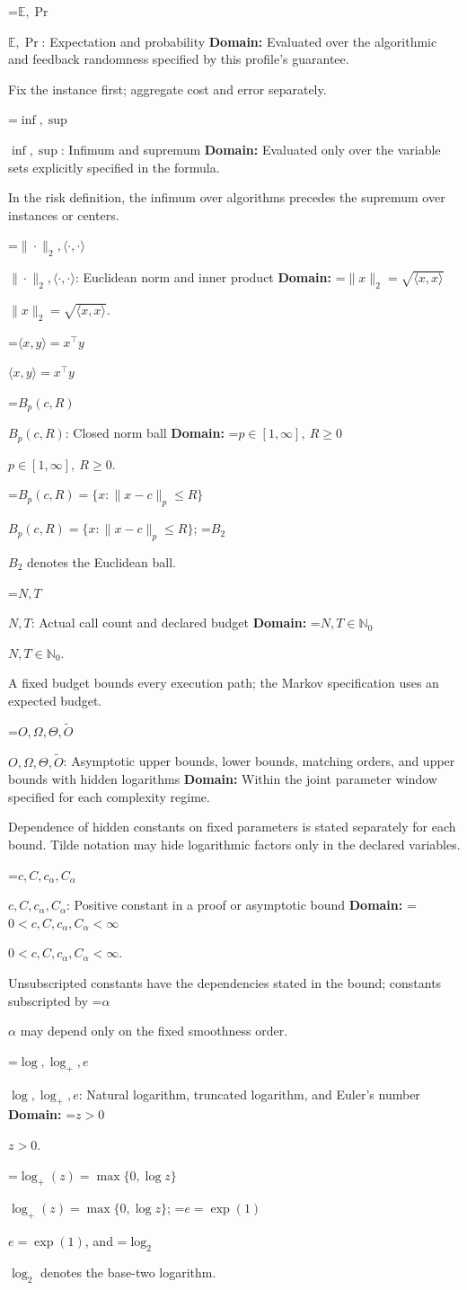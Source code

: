 \documentclass[10pt,a4paper]{article}
\newcommand{\AtlasMath}[1]{\par\begingroup\centering\setbox0=\hbox{$\displaystyle #1$}\ifdim\wd0>1.4\linewidth\typeout{ATLAS WIDE FORMULA: \the\wd0}\fi\ifdim\wd0>\linewidth\resizebox{\linewidth}{!}{\box0}\else\box0\fi\par\endgroup}
\newcommand{\AtlasInlineMath}[1]{\begingroup\setbox0=\hbox{$#1$}\ifdim\wd0>.4\linewidth\endgroup\AtlasMath{#1}\else\endgroup$#1$\fi}
\begin{document}
\AtlasInlineMath{\mathbb{E},\Pr}: Expectation and probability \textbf{Domain:} Evaluated over the algorithmic and feedback randomness specified by this profile's guarantee.

Fix the instance first; aggregate cost and error separately.

\AtlasInlineMath{\inf,\sup}: Infimum and supremum \textbf{Domain:} Evaluated only over the variable sets explicitly specified in the formula.

In the risk definition, the infimum over algorithms precedes the supremum over instances or centers.

\AtlasInlineMath{\|\cdot\|_2,\langle\cdot,\cdot\rangle}: Euclidean norm and inner product \textbf{Domain:} \AtlasInlineMath{\|x\|_2=\sqrt{\langle x,x\rangle}}.

\AtlasInlineMath{\langle x,y\rangle=x^\top y}

\AtlasInlineMath{B_p(c,R)}: Closed norm ball \textbf{Domain:} \AtlasInlineMath{p\in[1,\infty],\ R\ge0}.

\AtlasInlineMath{B_p(c,R)=\{x:\|x-c\|_p\le R\}}; \AtlasInlineMath{B_2} denotes the Euclidean ball.

\AtlasInlineMath{N,T}: Actual call count and declared budget \textbf{Domain:} \AtlasInlineMath{N,T\in\mathbb{N}_0}.

A fixed budget bounds every execution path; the Markov specification uses an expected budget.

\AtlasInlineMath{O,\Omega,\Theta,\widetilde{O}}: Asymptotic upper bounds, lower bounds, matching orders, and upper bounds with hidden logarithms \textbf{Domain:} Within the joint parameter window specified for each complexity regime.

Dependence of hidden constants on fixed parameters is stated separately for each bound. Tilde notation may hide logarithmic factors only in the declared variables.

\AtlasInlineMath{c,C,c_\alpha,C_\alpha}: Positive constant in a proof or asymptotic bound \textbf{Domain:} \AtlasInlineMath{0<c,C,c_\alpha,C_\alpha<\infty}.

Unsubscripted constants have the dependencies stated in the bound; constants subscripted by \AtlasInlineMath{\alpha} may depend only on the fixed smoothness order.

\AtlasInlineMath{\log,\log_+,e}: Natural logarithm, truncated logarithm, and Euler's number \textbf{Domain:} \AtlasInlineMath{z>0}.

\AtlasInlineMath{\log_+(z)=\max\{0,\log z\}}; \AtlasInlineMath{e=\exp(1)}, and \AtlasInlineMath{\log_2} denotes the base-two logarithm.
\end{document}
